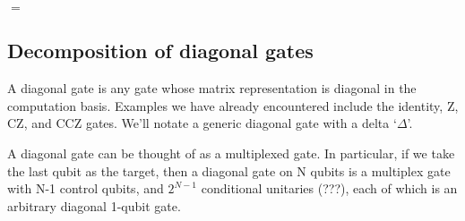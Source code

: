 \begin{center}
$ = $
\end{center}


\subsection{Decomposition of diagonal gates}

A diagonal gate is any gate whose matrix representation is diagonal in the computation basis. Examples we have already encountered include the identity, Z, CZ, and CCZ gates. We'll notate a generic diagonal gate with a delta `$\Delta$'.
\begin{center}
\end{center}
A diagonal gate can be thought of as a multiplexed gate. In particular, if we take the last qubit as the target, then a diagonal gate on N qubits is a multiplex gate with N-1 control qubits, and $2^{N-1}$ conditional unitaries (???), each of which is an arbitrary diagonal 1-qubit gate.

